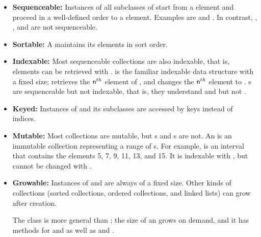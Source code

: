 \documentclass[a4paper,10pt,twoside]{book}
\begin{document}
\begin{itemize}
  \item {\bf Sequenceable:}
  Instances of all subclasses of  start from a  element and proceed in a well-defined order to a  element. Examples are  and .
  In contrast, , , and  are not sequenceable.

  \item {\bf Sortable:}
  A  maintains its elements in sort order.

  \item {\bf Indexable:}
	Most sequenceable collections are also indexable, that is, elements can be retrieved with .
	 is the familiar indexable data structure with a fixed size;  retrieves the $\mbox{\ct{n}}^{th}$ element of , and  changes the $\mbox{\ct{n}}^{th}$ element to .
	s are sequenceable but not indexable, that is, they understand  and  but not .

  \item {\bf Keyed:}
	Instances of  and its subclasses are accessed by keys instead of indices.

  \item {\bf Mutable:}
  	Most collections are mutable, but s and s are not.
  An  is an immutable collection representing a range of s.
  For example,  is an interval that contains the elements 5, 7, 9, 11, 13, and 15.
  It is indexable with , but cannot be changed with .

  \item {\bf Growable:}
    Instances of  and  are always of a fixed size.
    Other kinds of collections (sorted collections, ordered collections, and linked lists) can grow after creation.

	The class  is more general than ; the size of an  grows on demand, and it has methods for  and  as well as  and .


\end{itemize}
\end{document}
